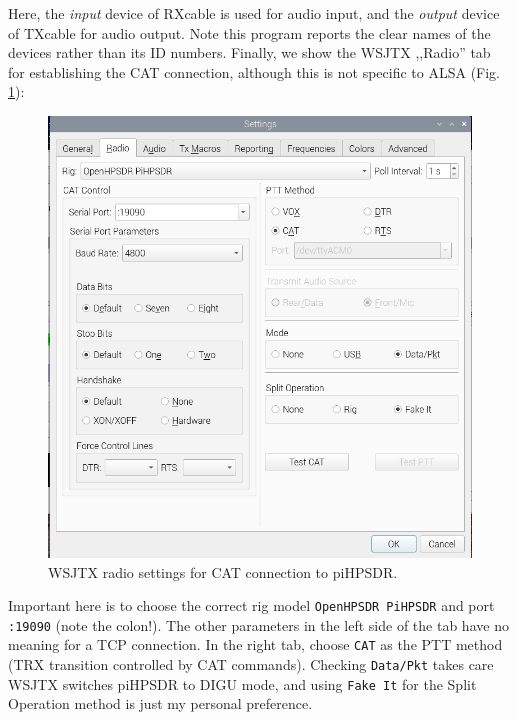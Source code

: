 \documentclass[12pt]{book}
\def\rett#1{\texttt{\color{red}#1}}
\begin{document}
Here, the \textit{input} device of RXcable is used for audio input, and the
\textit{output} device of TXcable for audio output. Note this program reports the
clear names of the devices rather than its ID numbers. Finally, we show the WSJTX ,,Radio''
tab for establishing the CAT connection, although this is not specific to ALSA 
(Fig. \ref{fig:wsjtx_settings_radio}):

\begin{figure}[ht]
\center
\includegraphics[width=12cm]{wsjtx_settings_radio.png}
\caption{WSJTX radio settings for CAT connection to piHPSDR.}
\label{fig:wsjtx_settings_radio}
\end{figure}

Important here is to choose the correct rig model \rett{OpenHPSDR PiHPSDR} and
port \rett{:19090} (note the colon!). The other parameters in the left side of the tab
have no meaning for a TCP connection. In the right tab, choose \rett{CAT} as
the PTT method (TRX transition controlled by CAT commands). Checking \rett{Data/Pkt}
takes care WSJTX switches piHPSDR to DIGU mode, and using \rett{Fake It} for the Split
Operation method is just my personal preference.
\end{document}
